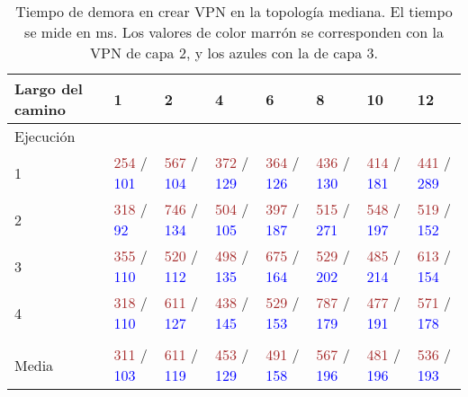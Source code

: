 \begin{table}[ht]
	\scriptsize
	\caption{Tiempo de demora en crear VPN en la topología mediana. El tiempo se mide en ms. Los valores de color marrón se corresponden con la VPN de capa 2, y los azules con la de capa 3.}
	\centering 
	\begin{tabular}{p{2.4cm} p{1.3cm} p{1.3cm} p{1.3cm} p{1.3cm} p{1.3cm} p{1.3cm} p{1.3cm}}
		\hline
		Largo del camino & 1 & 2 & 4 & 6 & 8 & 10 & 12 \\ [0.5ex]
		\hline
		Ejecución & & & & & & & \\
		1 & \textcolor{brown}{254} / \textcolor{blue}{101} & \textcolor{brown}{567} / \textcolor{blue}{104} & \textcolor{brown}{372} / \textcolor{blue}{129} & \textcolor{brown}{364} / \textcolor{blue}{126} & \textcolor{brown}{436} / \textcolor{blue}{130} & \textcolor{brown}{414} / \textcolor{blue}{181} & \textcolor{brown}{441} / \textcolor{blue}{289} \\
		2 & \textcolor{brown}{318} / \textcolor{blue}{92} & \textcolor{brown}{746} / \textcolor{blue}{134} & \textcolor{brown}{504} / \textcolor{blue}{105} & \textcolor{brown}{397} / \textcolor{blue}{187}  & \textcolor{brown}{515} / \textcolor{blue}{271} & \textcolor{brown}{548} / \textcolor{blue}{197} & \textcolor{brown}{519} / \textcolor{blue}{152} \\
		3 & \textcolor{brown}{355} / \textcolor{blue}{110} & \textcolor{brown}{520} / \textcolor{blue}{112} & \textcolor{brown}{498} / \textcolor{blue}{135} & \textcolor{brown}{675} / \textcolor{blue}{164} & \textcolor{brown}{529} / \textcolor{blue}{202} & \textcolor{brown}{485} / \textcolor{blue}{214} & \textcolor{brown}{613} / \textcolor{blue}{154} \\
		4 & \textcolor{brown}{318} / \textcolor{blue}{110} & \textcolor{brown}{611} / \textcolor{blue}{127} & \textcolor{brown}{438} / \textcolor{blue}{145} & \textcolor{brown}{529} / \textcolor{blue}{153} & \textcolor{brown}{787} / \textcolor{blue}{179} & \textcolor{brown}{477} / \textcolor{blue}{191} & \textcolor{brown}{571} / \textcolor{blue}{178} \\
		& & & & & & & \\
		Media & \textcolor{brown}{311} / \textcolor{blue}{103} & \textcolor{brown}{611} / \textcolor{blue}{119} & \textcolor{brown}{453} / \textcolor{blue}{129} & \textcolor{brown}{491} / \textcolor{blue}{158} & \textcolor{brown}{567} / \textcolor{blue}{196} & \textcolor{brown}{481} / \textcolor{blue}{196} & \textcolor{brown}{536} / \textcolor{blue}{193} \\

\end{tabular}
\end{table}
